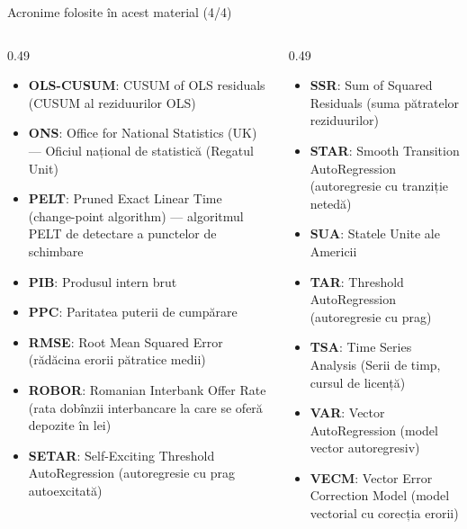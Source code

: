 \begin{frame}{Acronime folosite în acest material (4/4)}
\begin{columns}[T]
\begin{column}{0.49\textwidth}
\begin{itemize}\setlength{\itemsep}{0pt}
    \item \textbf{OLS-CUSUM}: CUSUM of OLS residuals (CUSUM al reziduurilor OLS)
    \item \textbf{ONS}: Office for National Statistics (UK) — Oficiul național de statistică (Regatul Unit)
    \item \textbf{PELT}: Pruned Exact Linear Time (change-point algorithm) — algoritmul PELT de detectare a punctelor de schimbare
    \item \textbf{PIB}: Produsul intern brut
    \item \textbf{PPC}: Paritatea puterii de cumpărare
    \item \textbf{RMSE}: Root Mean Squared Error (rădăcina erorii pătratice medii)
    \item \textbf{ROBOR}: Romanian Interbank Offer Rate (rata dobînzii interbancare la care se oferă depozite în lei)
    \item \textbf{SETAR}: Self-Exciting Threshold AutoRegression (autoregresie cu prag autoexcitată)
\end{itemize}
\end{column}
\begin{column}{0.49\textwidth}
\begin{itemize}\setlength{\itemsep}{0pt}
    \item \textbf{SSR}: Sum of Squared Residuals (suma pătratelor reziduurilor)
    \item \textbf{STAR}: Smooth Transition AutoRegression (autoregresie cu tranziție netedă)
    \item \textbf{SUA}: Statele Unite ale Americii
    \item \textbf{TAR}: Threshold AutoRegression (autoregresie cu prag)
    \item \textbf{TSA}: Time Series Analysis (Serii de timp, cursul de licență)
    \item \textbf{VAR}: Vector AutoRegression (model vector autoregresiv)
    \item \textbf{VECM}: Vector Error Correction Model (model vectorial cu corecția erorii)
\end{itemize}
\end{column}
\end{columns}
\end{frame}

